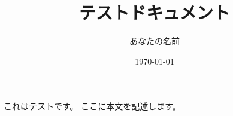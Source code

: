 \documentclass[uplatex]{jsarticle}
\title{テストドキュメント}
\author{あなたの名前}
\date{\today}
\begin{document}
\maketitle

これはテストです。
ここに本文を記述します。
\end{document}
